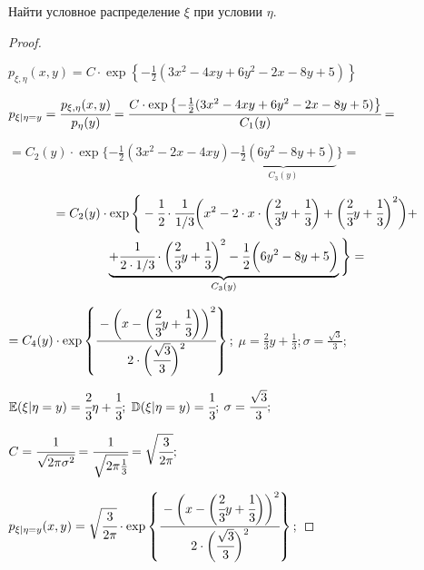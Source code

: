 \begin{problem}      
	Найти условное распределение $\xi$ при условии $\eta$. 
\end{problem}

\begin{proof}	
	$ $
	
	\large $ p_{\xi,\eta}(x, y) = C \cdot \exp \left\{-\frac12(3x^2 - 4xy + 6y^2 - 2x - 8y + 5)\right\} $
	
	$ p_{\xi|\eta=y}=\cfrac{p_{\xi,\eta}(x, y)}{p_{\eta}(y)}= \cfrac{C \cdot \exp \left\{-\frac12(3x^2 - 4xy + 6y^2 - 2x - 8y + 5)\right\}}{C_1(y)}= $
	
	$ =C_2(y) \cdot \exp \{-\frac12(3x^2-2x-4xy)\underbrace{-\frac12(6y^2-8y+5)}_{C_3(y)}\}= $
	
	\begin{multline}	
	=C_2(y) \cdot \exp \Bigg\{-\cfrac12\cdot\cfrac1{1/3}\bigg(x^2-2\cdot x\cdot\bigg(\cfrac23y+\cfrac13\bigg)+\bigg(\cfrac23 y+\cfrac13\bigg)^2\bigg)+\\\underbrace{+\cfrac1{2\cdot 1/3}\cdot\bigg(\cfrac23y+\cfrac13\bigg)^2 -\frac12\bigg(6y^2-8y+5\bigg)}_{C_3(y)}\Bigg\}=
	\end{multline}

	\large $ =C_4(y) \cdot \exp \left\{\cfrac{-\bigg(x-\bigg(\cfrac23 y+\cfrac13\bigg)\bigg)^2}{2\cdot\bigg(\cfrac{\sqrt{3}}{3}\bigg)^2}\right\}; $ \Large $ \mu=\frac23y+\frac13; \sigma=\frac{\sqrt{3}}{3}; $ \large
	
	$ \mathbb E(\xi|\eta=y)=\cfrac23\eta+\cfrac13; $ 	
	$ \mathbb D(\xi|\eta=y)=\cfrac13; $ 	
	$ \sigma=\cfrac{\sqrt{3}}{3}; $ 
	
	$ C = \cfrac1{\sqrt{2\pi\sigma^2}}=\cfrac1{\sqrt{2\pi\frac13}}=\sqrt{\cfrac3{2\pi}}; $
	
	$ p_{\xi|\eta=y}(x, y)=\sqrt{\cfrac3{2\pi}}\cdot \exp \left\{\cfrac{-\bigg(x-\bigg(\cfrac23 y+\cfrac13\bigg)\bigg)^2}{2\cdot\bigg(\cfrac{\sqrt{3}}{3}\bigg)^2}\right\}; $
	
\end{proof}







